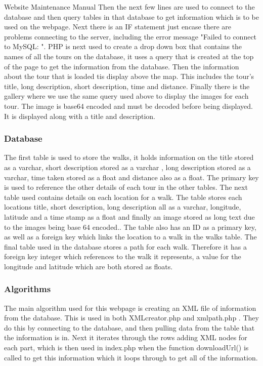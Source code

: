 \documentclass{article}
\begin{document}
\begin{section}{Website Maintenance Manual}
		Then the next few lines are used to connect to the database and then query tables in that database to get information which is to be used on the webpage. Next there is an IF statement just encase there are problems connecting to the server, including the error message "Failed to connect to MySQL: ".
PHP is next used to create a drop down box that contains the names of all the tours on the database, it uses a query that is created at the top of the page to get the information from the database.
Then the information about the tour that is loaded tis display above the map. This includes the tour's title, long description, short description, time and distance.
Finally there is the gallery where we use the same query used above to display the images for each tour. The image is base64 encoded and must be decoded before being displayed. It is displayed along with a title and description.

		\subsubsection{Database}
		The first table is used to store the walks, it holds information on the title stored as a varchar, short description stored as a varchar , long description stored as a varchar, time taken stored as a float and distance also as a float. The primary key is used to reference the other details of each tour in the other tables. The next table used contains details on each location for a walk. The table stores each locations title, short description, long description all as a varchar, longitude, latitude and a time stamp as a float and finally an image stored as long text due to the images being base 64 encoded.. The table also has an ID as a primary key, as well as a foreign key which links the location to a walk in the walks table.
The final table used in the database stores a path for each walk. Therefore it has a foreign key integer which references to the walk it represents, a value for the longitude and latitude which are both stored as floats. 


		\subsubsection{Algorithms}
		The main algorithm used for this webpage is creating an XML file of information from the database. This is used in both XMLcreator.php and xmlpath.php . They do this by connecting to the database, and then pulling data from the table that the information is in. Next it iterates through the rows adding XML nodes for each part, which is then used in index.php when the function downloadUrl() is called to get this information which it loops through to get all of the information.



\end{section}
\end{document}
